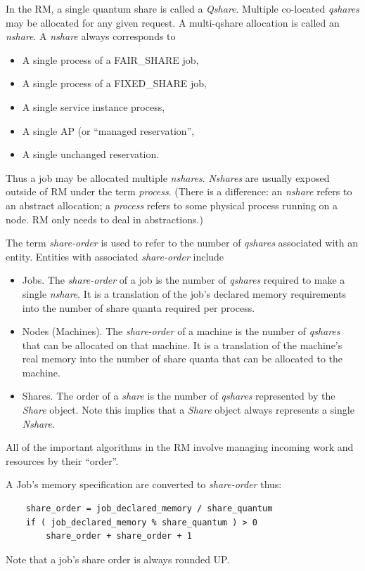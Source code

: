     In the RM, a single quantum share is called a {\em Qshare}.  Multiple co-located {\em qshares}
    may be allocated for any given request.  A multi-qshare allocation is called an {\em nshare}. A
    {\em nshare} always corresponds to 
    \begin{itemize}
      \item A single process of a FAIR\_SHARE job,
      \item A single process of a FIXED\_SHARE job,
      \item A single service instance process,
      \item A single AP (or ``managed reservation'',
      \item A single unchanged reservation.
    \end{itemize}

    Thus a job may be allocated multiple {\em nshares}.  {\em Nshares} are usually exposed outside
    of RM under the term {\em process}.  (There is a difference: an {\em nshare} refers to an
    abstract allocation; a {\em process} refers to some physical process running on a node.  RM only
    needs to deal in abstractions.)
    
    The term {\em share-order} is used to refer to the number of {\em qshares} associated with
    an entity.  Entities with associated {\em share-order} include
    \begin{itemize}
      \item Jobs.  The {\em share-order} of a job is the number of {\em qshares} required
        to make a single {\em nshare}.  It is a translation of the job's declared memory
        requirements into the number of share quanta required per process.
      \item Nodes (Machines).  The {\em share-order} of a machine is the number of
        {\em qshares} that can be allocated on that machine.  It is a translation of the
        machine's real memory into the number of share quanta that can be allocated to the machine.
      \item Shares.  The order of a {\em share} is the number of {\em qshares} represented
        by the {\em Share} object.  Note this implies that a {\em Share} object always
        represents a single {\em Nshare}.
    \end{itemize}
    
    All of the important algorithms in the RM involve managing incoming work and
    resources by their ``order''.

    A Job's memory specification are converted to {\em share-order} thus:
\begin{verbatim}
    share_order = job_declared_memory / share_quantum
    if ( job_declared_memory % share_quantum ) > 0
        share_order + share_order + 1
\end{verbatim}
    Note that a job's share order is always rounded UP.    
    
